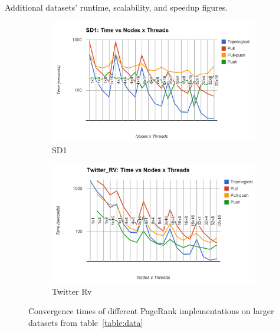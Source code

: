 \documentclass[letterpaper,11pt,onecolumn]{article}
\begin{document}
\vfill\pagebreak

\begin{appendices}

Additional datasets' runtime, scalability, and speedup figures.
\begin{figure}[!h]
\begin{subfigure}{.5\textwidth}
  \centering
  \includegraphics[width=.99\linewidth]{SD1Time}
  \caption{SD1}
  \label{fig:lgtime}
\end{subfigure}%
\begin{subfigure}{.5\textwidth}
  \centering
  \includegraphics[width=.99\linewidth]{TwitterRVTime}
  \caption{Twitter Rv}
  \label{fig:ftime}
\end{subfigure}
\caption{Convergence times of different PageRank implementations on larger datasets from table~\ref{table:data}}
\label{fig:time2}
\end{figure}


\end{appendices}
\end{document}

